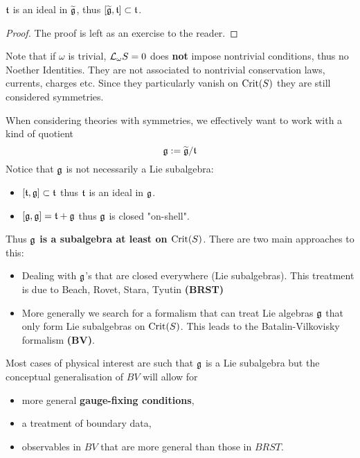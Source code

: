 \begin{lem}
  $\mathfrak{t}$ is an ideal in $\widetilde{\mathfrak{g}}$, thus $[\widetilde{\mathfrak{g}}, \mathfrak{t}] \subset \mathfrak{t}$.
\begin{proof}
  The proof is left as an exercise to the reader.
\end{proof}
\end{lem}

\begin{rem}
  Note that if $\omega$ is trivial, $\mathcal{L}_{\omega}S = 0$ does \textbf{not} impose nontrivial conditions, thus no Noether Identities. They are not associated to nontrivial conservation laws, currents, charges etc. Since they particularly vanish on $\operatorname{Crit}(S)$ they are still considered symmetries.
\end{rem}

When considering theories with symmetries, we effectively want to work with a kind of quotient
\begin{equation}
  \mathfrak{g} := \widetilde{\mathfrak{g}}/\mathfrak{t}
\end{equation}
Notice that $\mathfrak{g}$ is not necessarily a Lie subalgebra:
\begin{itemize}
  \item $[\mathfrak{t}, \mathfrak{g}] \subset \mathfrak{t}$ thus $\mathfrak{t}$ is an ideal in $\mathfrak{g}$.
  \item $[\mathfrak{g}, \mathfrak{g}] = \mathfrak{t} + \mathfrak{g}$ thus $\mathfrak{g}$ is closed "on-shell".
\end{itemize}
Thus \textbf{$\mathfrak{g}$ is a subalgebra at least on $\operatorname{Crit}(S)$}. There are two main approaches to this:

\begin{itemize}
  \item Dealing with $\mathfrak{g}$'s that are closed everywhere (Lie subalgebras). This treatment is due to Beach, Rovet, Stara, Tyutin \textbf{(BRST)}
  \item More generally we search for a formalism that can treat Lie algebras $\mathfrak{g}$ that only form Lie subalgebras on $\operatorname{Crit}(S)$. This leads to the Batalin-Vilkovisky formalism \textbf{(BV)}.
\end{itemize}

Most cases of physical interest are such that $\mathfrak{g}$ is a Lie subalgebra but the conceptual generalisation of $BV$ will allow for
\begin{itemize}
  \item more general \textbf{gauge-fixing conditions},
  \item a treatment of boundary data,
  \item observables in $BV$ that are more general than those in $BRST$.
\end{itemize}

